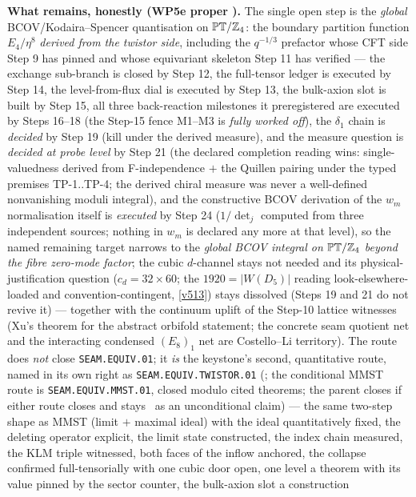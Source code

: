 \par\smallskip\noindent\textbf{What remains, honestly (WP5e proper \mO).}
The single open step is the \emph{global} BCOV/Kodaira--Spencer quantisation on $\mathbb{PT}/\mathbb{Z}_4$:
the boundary partition function $E_4/\eta^8$ \emph{derived from the twistor side}, including the
$q^{-1/3}$ prefactor whose CFT side Step 9 has pinned and whose equivariant skeleton Step 11 has
verified --- the exchange sub-branch is closed by Step 12, the full-tensor ledger is executed by
Step 14, the level-from-flux dial is executed
by Step 13, the bulk-axion slot is built by Step 15, all three back-reaction milestones it
preregistered are executed by Steps 16--18 (the Step-15 fence M1--M3 is \emph{fully worked
off}), the $\delta_1$ chain is \emph{decided} by Step 19 (kill under the derived measure),
and the measure question is \emph{decided at probe level} by Step 21 (the declared completion
reading wins: single-valuedness derived from F-independence $+$ the Quillen pairing under the
typed premises TP-1..TP-4; the derived chiral measure was never a well-defined nonvanishing
moduli integral), and the constructive BCOV derivation of the $w_m$ normalisation itself is
\emph{executed} by Step 24 ($1/\det_j$ computed from three independent sources; nothing in
$w_m$ is declared any more at that level), so the named remaining target narrows to the
\emph{global BCOV integral on $\mathbb{PT}/\mathbb{Z}_4$ beyond the fibre zero-mode factor};
the cubic $d$-channel stays not needed
and its physical-justification question ($c_d=32\times60$; the
$1920=|W(D_5)|$ reading look-elsewhere-loaded and convention-contingent, \vref{v513}) stays
dissolved (Steps 19 and 21 do not revive it) --- together with the
continuum uplift of the Step-10 lattice witnesses (Xu's theorem for the abstract orbifold
statement; the concrete seam quotient net and the interacting condensed $(E_8)_1$ net are
Costello--Li territory). The route does \emph{not} close \texttt{SEAM.EQUIV.01}; it \emph{is} the
keystone's second, quantitative route, named in its own right as \texttt{SEAM.EQUIV.TWISTOR.01}
(\mO; the conditional MMST route is \texttt{SEAM.EQUIV.MMST.01}, closed modulo cited theorems; the
parent closes if either route closes and stays \mO\ as an unconditional claim) --- the same
two-step shape as MMST (limit $+$ maximal
ideal) with the ideal quantitatively fixed, the deleting operator explicit, the limit state
constructed, the index chain measured, the KLM triple witnessed, both faces of the inflow
anchored, the collapse confirmed full-tensorially with one cubic door open, one level a
theorem with its value pinned by the sector counter, the bulk-axion slot a construction
